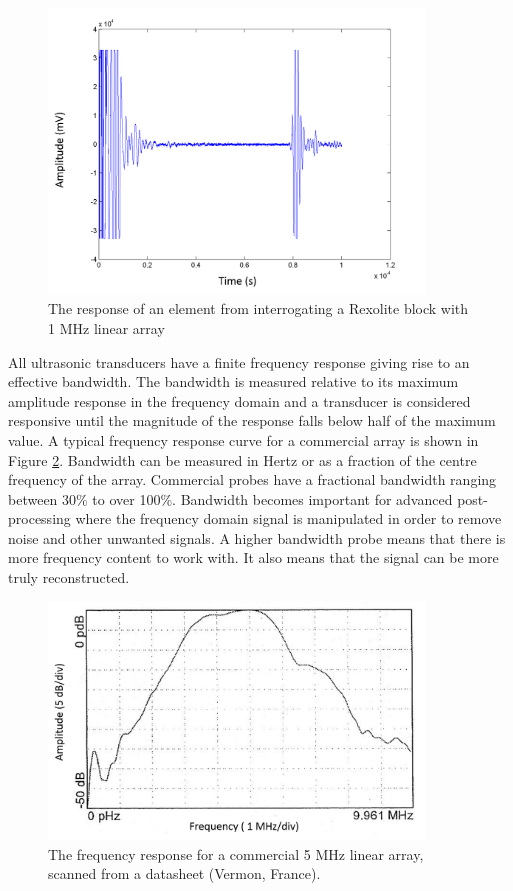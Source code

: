 \begin{figure}[htp]
\centering
		\includegraphics[width=100mm]{Ringdown_axes.png}
		\caption{The response of an element from interrogating a Rexolite block with 1 MHz linear array}
		\label{fig:review_ringdown}
\end{figure}

All ultrasonic transducers have a finite frequency response giving rise to an effective bandwidth. The bandwidth is measured relative to its maximum amplitude response in the frequency domain and a transducer is considered responsive until the magnitude of the response falls below half of the maximum value. A typical frequency response curve for a commercial array is shown in Figure \ref{fig:review_freqresponse}. Bandwidth can be measured in Hertz or as a fraction of the centre frequency of the array. Commercial probes have a fractional bandwidth ranging between 30\% to over 100\%\cite{nowicki_influence_2007}. Bandwidth becomes important for advanced post-processing where the frequency domain signal is manipulated in order to remove noise and other unwanted signals. A higher bandwidth probe means that there is more frequency content to work with. It also means that the signal can be more truly reconstructed.

\begin{figure}[htp]
\centering
		\includegraphics[width=100mm]{FreqResponse_axes.png}
		\caption{The frequency response for a commercial 5 MHz linear array, scanned from a datasheet (Vermon, France).}
		\label{fig:review_freqresponse}
\end{figure}

